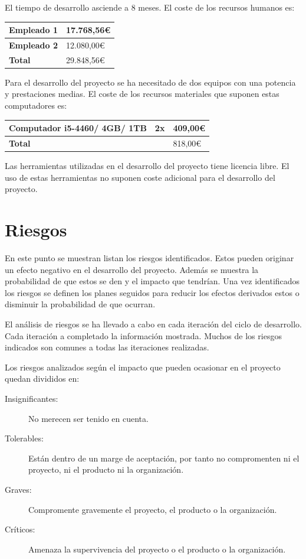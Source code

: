 El tiempo de desarrollo asciende a 8 meses. El coste de los recursos humanos es:

\begin{tabular}{|l|l|} \hline
\textbf{Empleado 1} &  17.768,56€ \\ \hline
\textbf{Empleado 2} &  12.080,00€ \\ \hline
\textbf{Total} &  29.848,56€ \\ \hline
\end{tabular}
 
 Para el desarrollo del proyecto se ha necesitado de dos equipos con una potencia y prestaciones medias. El
 coste de los recursos materiales que suponen estas computadores es:
 
 \begin{tabular}{|l|l|l|} \hline
\textbf{Computador \tiny{i5-4460/ 4GB/ 1TB} } & 2x & 409,00€ \\ \hline
\textbf{Total} & & 818,00€ \\ \hline
\end{tabular}

Las herramientas utilizadas en el desarrollo del proyecto tiene licencia libre. El uso de estas herramientas no
suponen coste adicional para el desarrollo del proyecto. 

\section{Riesgos}

En este punto se muestran listan los riesgos identificados. Estos pueden originar un efecto negativo en el 
desarrollo del proyecto. Además se muestra la probabilidad de que estos se den y el impacto que tendrían. 
Una vez identificados los riesgos se definen los planes seguidos para reducir los efectos derivados estos o disminuir
la probabilidad de que ocurran.

El análisis de riesgos se ha llevado a cabo en cada iteración del ciclo de desarrollo. Cada iteración a completado la 
información mostrada. Muchos de los riesgos indicados son comunes a todas las iteraciones realizadas. 

Los riesgos analizados según el impacto que pueden ocasionar en el proyecto quedan divididos en:
\begin {description}
\item[Insignificantes:] No merecen ser tenido en cuenta.
\item[Tolerables:] Están dentro de un marge de aceptación, por tanto no compromenten ni el proyecto, ni el producto ni la organización.
\item[Graves:] Compromente gravemente el proyecto, el producto o la organización.
\item[Críticos:] Amenaza la supervivencia del proyecto o el producto o la organización.
\end{description}

